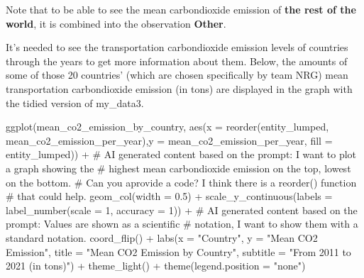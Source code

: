 \documentclass[
  11pt,
  a4paper,
  DIV=11,
  numbers=noendperiod]{scrartcl}
\newenvironment{Shaded}{\begin{snugshade}}{\end{snugshade}}
\newcommand{\AttributeTok}[1]{\textcolor[rgb]{0.40,0.45,0.13}{#1}}
\newcommand{\CommentTok}[1]{\textcolor[rgb]{0.37,0.37,0.37}{#1}}
\newcommand{\DecValTok}[1]{\textcolor[rgb]{0.68,0.00,0.00}{#1}}
\newcommand{\FloatTok}[1]{\textcolor[rgb]{0.68,0.00,0.00}{#1}}
\newcommand{\FunctionTok}[1]{\textcolor[rgb]{0.28,0.35,0.67}{#1}}
\newcommand{\NormalTok}[1]{\textcolor[rgb]{0.00,0.23,0.31}{#1}}
\newcommand{\SpecialCharTok}[1]{\textcolor[rgb]{0.37,0.37,0.37}{#1}}
\newcommand{\StringTok}[1]{\textcolor[rgb]{0.13,0.47,0.30}{#1}}
\begin{document}
Note that to be able to see the mean carbondioxide emission of
\textbf{the rest of the world}, it is combined into the observation
\textbf{Other}.

It's needed to see the transportation carbondioxide emission levels of
countries through the years to get more information about them. Below,
the amounts of some of those 20 countries' (which are chosen
specifically by team NRG) mean transportation carbondioxide emission (in
tons) are displayed in the graph with the tidied version of my\_data3.

\begin{Shaded}
\begin{Highlighting}[]
\FunctionTok{ggplot}\NormalTok{(mean\_co2\_emission\_by\_country, }\FunctionTok{aes}\NormalTok{(}\AttributeTok{x =} \FunctionTok{reorder}\NormalTok{(entity\_lumped, mean\_co2\_emission\_per\_year),}\AttributeTok{y =}\NormalTok{ mean\_co2\_emission\_per\_year,}
                                         \AttributeTok{fill =}\NormalTok{ entity\_lumped)) }\SpecialCharTok{+}
\CommentTok{\# AI generated content based on the prompt: I want to plot a graph showing the}
\CommentTok{\# highest mean carbondioxide emission on the top, lowest on the bottom.}
\CommentTok{\# Can you aprovide a code? I think there is a reorder() function}
\CommentTok{\# that could help.}
  \FunctionTok{geom\_col}\NormalTok{(}\AttributeTok{width =} \FloatTok{0.5}\NormalTok{) }\SpecialCharTok{+}
  \FunctionTok{scale\_y\_continuous}\NormalTok{(}\AttributeTok{labels =} \FunctionTok{label\_number}\NormalTok{(}\AttributeTok{scale =} \DecValTok{1}\NormalTok{, }\AttributeTok{accuracy =} \DecValTok{1}\NormalTok{)) }\SpecialCharTok{+}
\CommentTok{\# AI generated content based on the prompt: Values are shown as a scientific}
\CommentTok{\# notation, I want to show them with a standard notation.}
  \FunctionTok{coord\_flip}\NormalTok{() }\SpecialCharTok{+}
  \FunctionTok{labs}\NormalTok{(}\AttributeTok{x =} \StringTok{"Country"}\NormalTok{,}
       \AttributeTok{y =} \StringTok{"Mean CO2 Emission"}\NormalTok{,}
       \AttributeTok{title =} \StringTok{"Mean CO2 Emission by Country"}\NormalTok{,}
       \AttributeTok{subtitle =} \StringTok{"From 2011 to 2021 (in tons)"}\NormalTok{) }\SpecialCharTok{+}
  \FunctionTok{theme\_light}\NormalTok{() }\SpecialCharTok{+}
  \FunctionTok{theme}\NormalTok{(}\AttributeTok{legend.position =} \StringTok{"none"}\NormalTok{)}
\end{Highlighting}
\end{Shaded}
\end{document}
